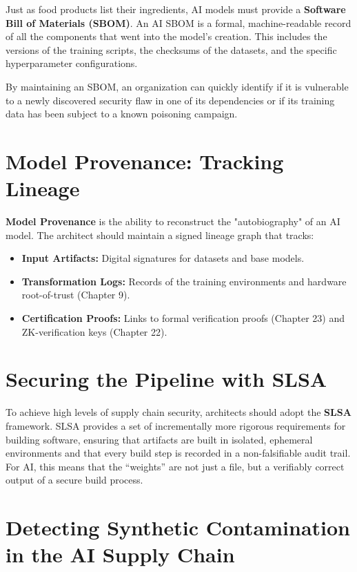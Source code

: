Just as food products list their ingredients, AI models must provide a \textbf{Software Bill of Materials (SBOM)}. An AI SBOM is a formal, machine-readable record of all the components that went into the model's creation. This includes the versions of the training scripts, the checksums of the datasets, and the specific hyperparameter configurations.

By maintaining an SBOM, an organization can quickly identify if it is vulnerable to a newly discovered security flaw in one of its dependencies or if its training data has been subject to a known poisoning campaign.

\section{Model Provenance: Tracking Lineage}
\label{sec:provenance_lineage}

\textbf{Model Provenance} is the ability to reconstruct the "autobiography" of an AI model. The architect should maintain a signed lineage graph that tracks:
\begin{itemize}
    \item \textbf{Input Artifacts:} Digital signatures for datasets and base models.
    \item \textbf{Transformation Logs:} Records of the training environments and hardware root-of-trust (Chapter 9).
    \item \textbf{Certification Proofs:} Links to formal verification proofs (Chapter 23) and ZK-verification keys (Chapter 22).
\end{itemize}

\section{Securing the Pipeline with SLSA}
\label{sec:slsa}

To achieve high levels of supply chain security, architects should adopt the \textbf{SLSA} framework. SLSA provides a set of incrementally more rigorous requirements for building software, ensuring that artifacts are built in isolated, ephemeral environments and that every build step is recorded in a non-falsifiable audit trail. For AI, this means that the ``weights'' are not just a file, but a verifiably correct output of a secure build process.

\section{Detecting Synthetic Contamination in the AI Supply Chain}
\label{sec:synthetic-contamination}


